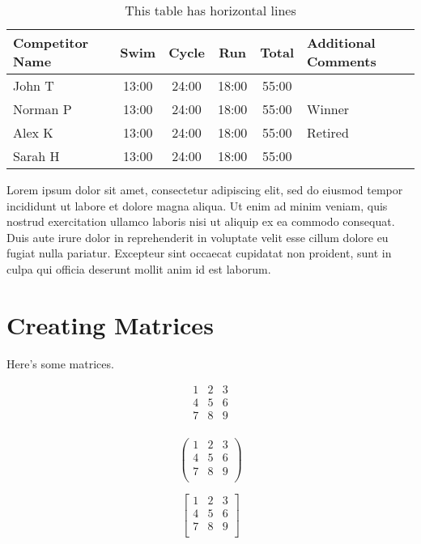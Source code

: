 \documentclass[]{article}
\begin{document}
\begin{table}[h]
\centering
\caption{This table has horizontal lines}
\begin{tabular}{l | c | c | c | c | l}  %
Competitor Name & Swim & Cycle & Run & Total & Additional Comments\\
\hline \hline
John T & 13:00 & 24:00 & 18:00 & 55:00 \\
\hline
Norman P & 13:00 & 24:00 & 18:00 & 55:00 & Winner \\
\hline
Alex K & 13:00 & 24:00 & 18:00 & 55:00 & Retired \\
\hline
Sarah H & 13:00 & 24:00 & 18:00 & 55:00 

\end{tabular}
\end{table}

Lorem ipsum dolor sit amet, consectetur adipiscing elit, sed do eiusmod tempor incididunt ut labore et dolore magna aliqua. Ut enim ad minim veniam, quis nostrud exercitation ullamco laboris nisi ut aliquip ex ea commodo consequat. Duis aute irure dolor in reprehenderit in voluptate velit esse cillum dolore eu fugiat nulla pariatur. Excepteur sint occaecat cupidatat non proident, sunt in culpa qui officia deserunt mollit anim id est laborum.

\section{Creating Matrices}

Here's some matrices.

\[
\begin{matrix}
1 & 2 & 3 \\
4 & 5 & 6 \\
7 & 8 & 9 \\
\end{matrix}
\]

\[
\begin{pmatrix}
1 & 2 & 3 \\
4 & 5 & 6 \\
7 & 8 & 9 \\
\end{pmatrix}
\]

\[
\begin{bmatrix}
1 & 2 & 3 \\
4 & 5 & 6 \\
7 & 8 & 9 \\
\end{bmatrix}
\]
\end{document}
